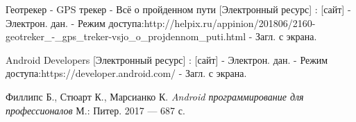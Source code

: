 \documentclass[a4paper,12pt]{article}
\begin{document}




\pagebreak

\renewcommand{\bibname}{Библиографический список использованной литературы}
\begin{thebibliography}{99}
\vspace{5mm}

Геотрекер - GPS трекер - Всё о пройденном пути [Электронный ресурс] : [сайт] - Электрон. дан. 
- Режим доступа:http://helpix.ru/appinion/201806/2160-geotreker\_-\_gps\_treker-vsjo\_o\_projdennom\_puti.html - Загл. с экрана.

Android Developers [Электронный ресурс] : [сайт] - Электрон. дан. 
- Режим доступа:https://developer.android.com/ - Загл. с экрана.

Филлипс Б., Стюарт К., Марсианко К. {\it Android программирование для профессионалов} М.: Питер. 2017 --- 687 с.

\end{thebibliography}

\end{document}
